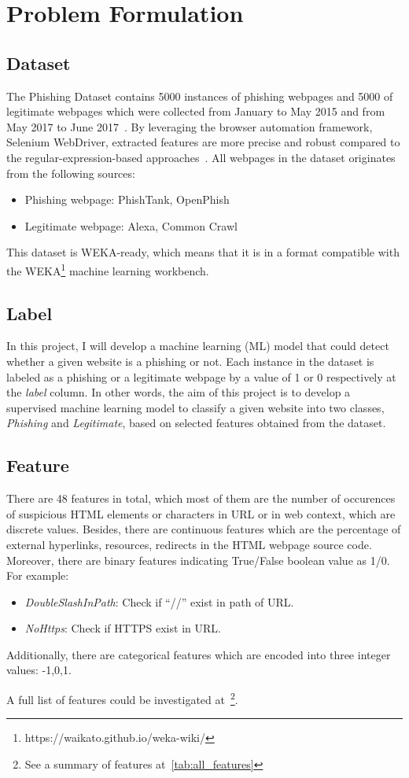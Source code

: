 \section{Problem Formulation}\label{sec:prob-formulation}

\subsection{Dataset}
The Phishing Dataset
contains 5000 instances of phishing webpages and 5000 of legitimate webpages which
were collected from January to May 2015 and from May 2017 to June 2017~\cite{dataset-source}. By leveraging
the browser automation framework, Selenium WebDriver, extracted features are more
precise and robust compared to the regular-expression-based approaches~\cite{CHIEW2019153}.
All webpages in the dataset originates from the following sources:
\begin{itemize}
    \item Phishing webpage: PhishTank, OpenPhish
    \item Legitimate webpage: Alexa, Common Crawl
\end{itemize}

This dataset is WEKA-ready, which means that it is in a format compatible with the
WEKA\footnote{https://waikato.github.io/weka-wiki/} machine learning workbench.

\subsection{Label}
In this project, I will develop a machine learning (ML) model that could detect whether a given
website is a phishing or not. Each instance in the dataset is labeled as a phishing
or a legitimate webpage by a value of 1 or 0 respectively at the \emph{label} column.
In other words, the aim of this project is to develop a supervised machine learning model
to classify a given website into two classes, \emph{Phishing} and \emph{Legitimate}, based
on selected features obtained from the dataset.

\subsection{Feature}
There are 48 features in total, which most of them are the number of occurences of suspicious
HTML elements or characters in URL or in web context, which are discrete values. Besides, there are
continuous features which are the percentage of external hyperlinks, resources, redirects in the
HTML webpage source code. Moreover, there are binary features indicating True/False boolean
value as 1/0. For example:
\begin{itemize}
    \item \emph{DoubleSlashInPath}: Check if ``//'' exist in path of URL.
    \item \emph{NoHttps}: Check if HTTPS exist in URL.
\end{itemize}

Additionally, there are categorical features which are encoded into three integer values: -1,0,1.

A full list of features could be investigated at~\cite{CHIEW2019153}\footnote{See a summary of features
at~\autoref{tab:all_features}}.
